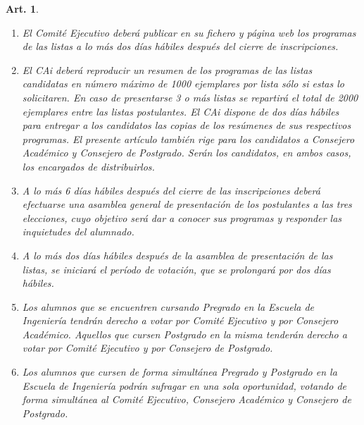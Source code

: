 \documentclass[letterpaper,11pt]{article}
\theoremstyle{plain}
\newtheorem{art}{Art.} %
\begin{document}
\begin{art}
\begin{enumerate}
				\item El Comité Ejecutivo deberá publicar en su fichero y página web los programas de las listas a lo más dos días hábiles después del cierre de inscripciones.
				
				\item El CAi deberá reproducir un resumen de los programas de las listas candidatas en número máximo de 1000 ejemplares por lista sólo si estas lo solicitaren. En caso de presentarse 3 o más listas se repartirá el total de 2000 ejemplares entre las listas postulantes. El CAi dispone de dos días hábiles para entregar a los candidatos las copias de los resúmenes de sus respectivos programas. El presente artículo también rige para los candidatos a Consejero Académico y Consejero de Postgrado. Serán los candidatos, en ambos casos, los encargados de distribuirlos.
				
				\item A lo más 6 días hábiles después del cierre de las inscripciones deberá efectuarse una asamblea general de presentación de los postulantes a las tres elecciones, cuyo objetivo será dar a conocer sus programas y responder las inquietudes del alumnado.
				
				\item \label{periodo}A lo más dos días hábiles después de la asamblea de presentación de las listas, se iniciará el período de votación, que se prolongará por dos días hábiles.
				
				\item \label{votantes}Los alumnos que se encuentren cursando Pregrado en la Escuela de Ingeniería tendrán derecho a votar por Comité Ejecutivo y por Consejero Académico. Aquellos que cursen Postgrado en la misma tenderán derecho a votar por Comité Ejecutivo y por Consejero de Postgrado.
				
				\item Los alumnos que cursen de forma simultánea Pregrado y Postgrado en la Escuela de Ingeniería podrán sufragar en una sola oportunidad, votando de forma simultánea al Comité Ejecutivo, Consejero Académico y Consejero de Postgrado.
				

\end{enumerate}
\end{art}
\end{document}
